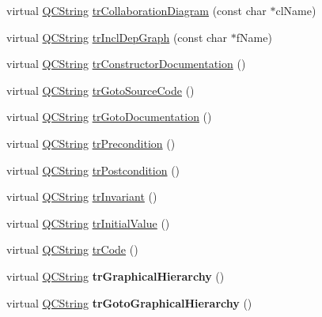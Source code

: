 \begin{DoxyCompactItemize}
\item 
virtual \hyperlink{class_q_c_string}{Q\-C\-String} \hyperlink{class_translator_chinesetraditional_ad5609f27835eb15d864cccee35b52b9d}{tr\-Collaboration\-Diagram} (const char $\ast$cl\-Name)
\item 
virtual \hyperlink{class_q_c_string}{Q\-C\-String} \hyperlink{class_translator_chinesetraditional_ac17e7ca1e68f7bb0eec49e9b1a6015af}{tr\-Incl\-Dep\-Graph} (const char $\ast$f\-Name)
\item 
virtual \hyperlink{class_q_c_string}{Q\-C\-String} \hyperlink{class_translator_chinesetraditional_ad81df771543dc5471455fde2bf0c36bb}{tr\-Constructor\-Documentation} ()
\item 
virtual \hyperlink{class_q_c_string}{Q\-C\-String} \hyperlink{class_translator_chinesetraditional_a46ba95eb7a8841df0578285a6e6a085b}{tr\-Goto\-Source\-Code} ()
\item 
virtual \hyperlink{class_q_c_string}{Q\-C\-String} \hyperlink{class_translator_chinesetraditional_a1b7438129838d73354533d168c4fb1bf}{tr\-Goto\-Documentation} ()
\item 
virtual \hyperlink{class_q_c_string}{Q\-C\-String} \hyperlink{class_translator_chinesetraditional_a338328abfdb1459810e2903dd18265d0}{tr\-Precondition} ()
\item 
virtual \hyperlink{class_q_c_string}{Q\-C\-String} \hyperlink{class_translator_chinesetraditional_abf2a58b0f4f38ff6068329a1beced84f}{tr\-Postcondition} ()
\item 
virtual \hyperlink{class_q_c_string}{Q\-C\-String} \hyperlink{class_translator_chinesetraditional_ab26b7ea104d6859adcc4d01340120e88}{tr\-Invariant} ()
\item 
virtual \hyperlink{class_q_c_string}{Q\-C\-String} \hyperlink{class_translator_chinesetraditional_a920e022240e5ed3525a79f422d00cd3e}{tr\-Initial\-Value} ()
\item 
virtual \hyperlink{class_q_c_string}{Q\-C\-String} \hyperlink{class_translator_chinesetraditional_a609c892c41043c2359060d4730a393cd}{tr\-Code} ()
\item 
\hypertarget{class_translator_chinesetraditional_a15bc6248c03a9959883a5114eca4db14}{virtual \hyperlink{class_q_c_string}{Q\-C\-String} {\bfseries tr\-Graphical\-Hierarchy} ()}\label{class_translator_chinesetraditional_a15bc6248c03a9959883a5114eca4db14}

\item 
\hypertarget{class_translator_chinesetraditional_a681c66c8a7d067c4ed547ce2175d944c}{virtual \hyperlink{class_q_c_string}{Q\-C\-String} {\bfseries tr\-Goto\-Graphical\-Hierarchy} ()}\label{class_translator_chinesetraditional_a681c66c8a7d067c4ed547ce2175d944c}


\end{DoxyCompactItemize}

